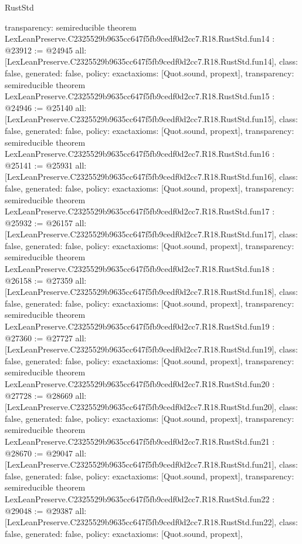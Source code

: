 \begin{lexlean}{RustStd}
\begin{coremodule}
{  transparency: semireducible
}
theorem LexLeanPreserve.C2325529b9635cc647f5fb9cedf0d2cc7.R18.RustStd.fun14 : @23912 := @24945 {
  all: [LexLeanPreserve.C2325529b9635cc647f5fb9cedf0d2cc7.R18.RustStd.fun14],
  class: false,
  generated: false,
  policy: exact{axioms: [Quot.sound, propext]},
  transparency: semireducible
}
theorem LexLeanPreserve.C2325529b9635cc647f5fb9cedf0d2cc7.R18.RustStd.fun15 : @24946 := @25140 {
  all: [LexLeanPreserve.C2325529b9635cc647f5fb9cedf0d2cc7.R18.RustStd.fun15],
  class: false,
  generated: false,
  policy: exact{axioms: [Quot.sound, propext]},
  transparency: semireducible
}
theorem LexLeanPreserve.C2325529b9635cc647f5fb9cedf0d2cc7.R18.RustStd.fun16 : @25141 := @25931 {
  all: [LexLeanPreserve.C2325529b9635cc647f5fb9cedf0d2cc7.R18.RustStd.fun16],
  class: false,
  generated: false,
  policy: exact{axioms: [Quot.sound, propext]},
  transparency: semireducible
}
theorem LexLeanPreserve.C2325529b9635cc647f5fb9cedf0d2cc7.R18.RustStd.fun17 : @25932 := @26157 {
  all: [LexLeanPreserve.C2325529b9635cc647f5fb9cedf0d2cc7.R18.RustStd.fun17],
  class: false,
  generated: false,
  policy: exact{axioms: [Quot.sound, propext]},
  transparency: semireducible
}
theorem LexLeanPreserve.C2325529b9635cc647f5fb9cedf0d2cc7.R18.RustStd.fun18 : @26158 := @27359 {
  all: [LexLeanPreserve.C2325529b9635cc647f5fb9cedf0d2cc7.R18.RustStd.fun18],
  class: false,
  generated: false,
  policy: exact{axioms: [Quot.sound, propext]},
  transparency: semireducible
}
theorem LexLeanPreserve.C2325529b9635cc647f5fb9cedf0d2cc7.R18.RustStd.fun19 : @27360 := @27727 {
  all: [LexLeanPreserve.C2325529b9635cc647f5fb9cedf0d2cc7.R18.RustStd.fun19],
  class: false,
  generated: false,
  policy: exact{axioms: [Quot.sound, propext]},
  transparency: semireducible
}
theorem LexLeanPreserve.C2325529b9635cc647f5fb9cedf0d2cc7.R18.RustStd.fun20 : @27728 := @28669 {
  all: [LexLeanPreserve.C2325529b9635cc647f5fb9cedf0d2cc7.R18.RustStd.fun20],
  class: false,
  generated: false,
  policy: exact{axioms: [Quot.sound, propext]},
  transparency: semireducible
}
theorem LexLeanPreserve.C2325529b9635cc647f5fb9cedf0d2cc7.R18.RustStd.fun21 : @28670 := @29047 {
  all: [LexLeanPreserve.C2325529b9635cc647f5fb9cedf0d2cc7.R18.RustStd.fun21],
  class: false,
  generated: false,
  policy: exact{axioms: [Quot.sound, propext]},
  transparency: semireducible
}
theorem LexLeanPreserve.C2325529b9635cc647f5fb9cedf0d2cc7.R18.RustStd.fun22 : @29048 := @29387 {
  all: [LexLeanPreserve.C2325529b9635cc647f5fb9cedf0d2cc7.R18.RustStd.fun22],
  class: false,
  generated: false,
  policy: exact{axioms: [Quot.sound, propext]},
}
\end{coremodule}
\end{lexlean}

